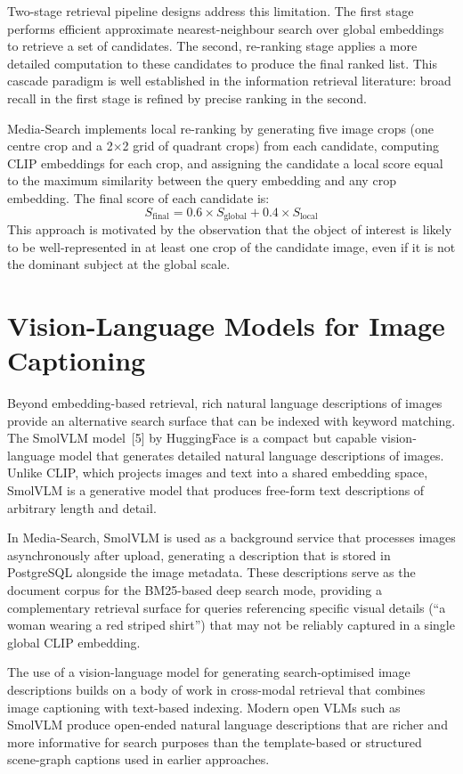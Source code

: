 \documentclass[12pt,a4paper,oneside]{report}
\begin{document}
Two-stage retrieval pipeline designs address this limitation. The first
stage performs efficient approximate nearest-neighbour search over global
embeddings to retrieve a set of candidates. The second, re-ranking stage
applies a more detailed computation to these candidates to produce the
final ranked list. This cascade paradigm is well established in the
information retrieval literature: broad recall in the first stage is refined
by precise ranking in the second.

Media-Search implements local re-ranking by generating five image crops (one
centre crop and a 2$\times$2 grid of quadrant crops) from each candidate,
computing CLIP embeddings for each crop, and assigning the candidate a local
score equal to the maximum similarity between the query embedding and any
crop embedding.  The final score of each candidate is:
\[
  S_{\text{final}}
  = 0.6 \times S_{\text{global}} + 0.4 \times S_{\text{local}}
\]
This approach is motivated by the observation that the object of interest is
likely to be well-represented in at least one crop of the candidate image, even
if it is not the dominant subject at the global scale.

\section{Vision-Language Models for Image Captioning}
Beyond embedding-based retrieval, rich natural language descriptions of images
provide an alternative search surface that can be indexed with keyword
matching. The SmolVLM model~[5] by HuggingFace is a compact but capable
vision-language model that generates detailed natural language descriptions
of images. Unlike CLIP, which projects images and text into a shared
embedding space, SmolVLM is a generative model that produces free-form text
descriptions of arbitrary length and detail.

In Media-Search, SmolVLM is used as a background service that processes
images asynchronously after upload, generating a description that is stored
in PostgreSQL alongside the image metadata. These descriptions serve as the
document corpus for the BM25-based deep search mode, providing a
complementary retrieval surface for queries referencing specific visual
details (``a woman wearing a red striped shirt'') that may not be reliably
captured in a single global CLIP embedding.

The use of a vision-language model for generating search-optimised image
descriptions builds on a body of work in cross-modal retrieval that combines
image captioning with text-based indexing. Modern open VLMs such as SmolVLM
produce open-ended natural language descriptions that are richer and more
informative for search purposes than the template-based or structured
scene-graph captions used in earlier approaches.
\end{document}
